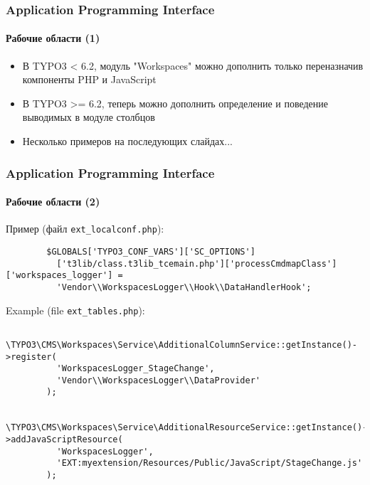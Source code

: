 
\begin{frame}[fragile]
	\frametitle{Application Programming Interface}
	\framesubtitle{Рабочие области (1)}

	\begin{itemize}
		\item В TYPO3 < 6.2, модуль "Workspaces" можно дополнить только переназначив компоненты PHP и JavaScript
		\item В TYPO3 >= 6.2, теперь можно дополнить определение и поведение выводимых в модуле столбцов
		\item Несколько примеров на последующих слайдах...
	\end{itemize}

\end{frame}


\begin{frame}[fragile]
	\frametitle{Application Programming Interface}
	\framesubtitle{Рабочие области (2)}

	\lstset{
		basicstyle=\tiny\ttfamily
	}

	Пример (файл \texttt{ext\_localconf.php}):

	\begin{lstlisting}
		$GLOBALS['TYPO3_CONF_VARS']['SC_OPTIONS']
		  ['t3lib/class.t3lib_tcemain.php']['processCmdmapClass']['workspaces_logger'] =
		  'Vendor\\WorkspacesLogger\\Hook\\DataHandlerHook';
	\end{lstlisting}

	Example (file \texttt{ext\_tables.php}):

	\begin{lstlisting}
		\TYPO3\CMS\Workspaces\Service\AdditionalColumnService::getInstance()->register(
		  'WorkspacesLogger_StageChange',
		  'Vendor\\WorkspacesLogger\\DataProvider'
		);

		\TYPO3\CMS\Workspaces\Service\AdditionalResourceService::getInstance()->addJavaScriptResource(
		  'WorkspacesLogger',
		  'EXT:myextension/Resources/Public/JavaScript/StageChange.js'
		);
	\end{lstlisting}

\end{frame}

